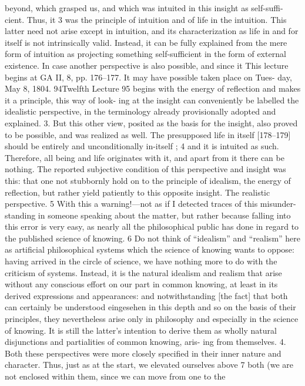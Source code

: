 beyond, which grasped us, and which was intuited in this insight as self-suffi-
cient. Thus, it 3 was the principle of intuition and of life in the intuition. This
latter need not arise except in intuition, and its characterization as life in and
for itself is not intrinsically valid. Instead, it can be fully explained from the
mere form of intuition as projecting something self-sufficient in the form of
external existence. In case another perspective is also possible, and since it
This lecture begins at GA II, 8, pp. 176–177. It may have possible taken place on Tues-
day, May 8, 1804.
94Twelfth Lecture
95
begins with the energy of reflection and makes it a principle, this way of look-
ing at the insight can conveniently be labelled the idealistic perspective, in the
terminology already provisionally adopted and explained.
3. But this other view, posited as the basis for the insight, also proved to
be possible, and was realized as well. The presupposed life in itself [178–179]
should be entirely and unconditionally in-itself ; 4 and it is intuited as such.
Therefore, all being and life originates with it, and apart from it there can be
nothing. The reported subjective condition of this perspective and insight was
this: that one not stubbornly hold on to the principle of idealism, the energy
of reflection, but rather yield patiently to this opposite insight. The realistic
perspective. 5
With this a warning!—not as if I detected traces of this misunder-
standing in someone speaking about the matter, but rather because falling into
this error is very easy, as nearly all the philosophical public has done in regard
to the published science of knowing. 6 Do not think of “idealism” and “realism”
here as artificial philosophical systems which the science of knowing wants to
oppose: having arrived in the circle of science, we have nothing more to do
with the criticism of systems. Instead, it is the natural idealism and realism
that arise without any conscious effort on our part in common knowing, at
least in its derived expressions and appearances: and notwithstanding [the
fact] that both can certainly be understood {eingesehen} in this depth and so
on the basis of their principles, they nevertheless arise only in philosophy and
especially in the science of knowing. It is still the latter’s intention to derive
them as wholly natural disjunctions and partialities of common knowing, aris-
ing from themselves.
4. Both these perspectives were more closely specified in their inner
nature and character. Thus, just as at the start, we elevated ourselves above 7
both (we are not enclosed within them, since we can move from one to the
